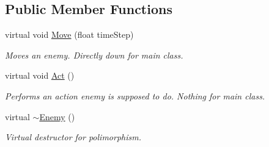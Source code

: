 \subsection*{Public Member Functions}
\begin{DoxyCompactItemize}
\item 
virtual void \hyperlink{class_enemy_ab7e37cac9017834db50d2aaf94e75034}{Move} (float time\+Step)
\begin{DoxyCompactList}\small\item\em Moves an enemy. Directly down for main class. \end{DoxyCompactList}\item 
\mbox{\label{class_enemy_ac65dfd9eae4c84e890f9196941b18d62}} 
virtual void \hyperlink{class_enemy_ac65dfd9eae4c84e890f9196941b18d62}{Act} ()
\begin{DoxyCompactList}\small\item\em Performs an action enemy is supposed to do. Nothing for main class. \end{DoxyCompactList}\item 
\mbox{\label{class_enemy_ac0eec4755e28c02688065f9657150ac3}} 
virtual \hyperlink{class_enemy_ac0eec4755e28c02688065f9657150ac3}{$\sim$\+Enemy} ()
\begin{DoxyCompactList}\small\item\em Virtual destructor for polimorphism. \end{DoxyCompactList}\end{DoxyCompactItemize}
